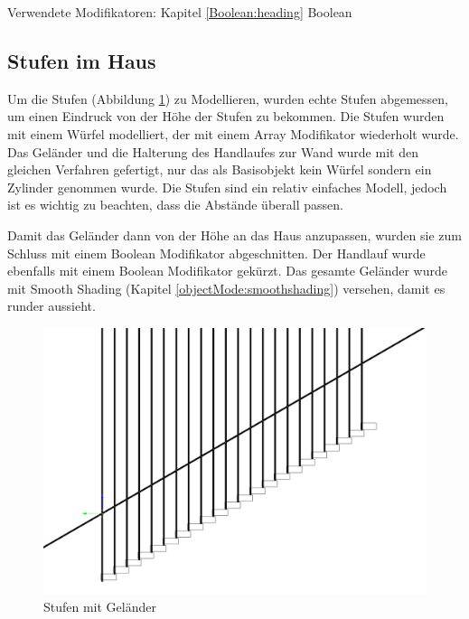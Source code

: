 Verwendete Modifikatoren: Kapitel \ref{Boolean:heading} Boolean

\subsection{Stufen im Haus}
\label{Stufen_Im_Haus:Heading}
Um die Stufen (Abbildung \ref{Stufen_Im_Haus:Bild}) zu Modellieren, wurden echte Stufen abgemessen, um einen Eindruck von der Höhe der Stufen zu bekommen.
Die Stufen wurden mit einem Würfel modelliert, der mit einem Array Modifikator wiederholt wurde. Das Geländer und die Halterung des Handlaufes zur Wand
wurde mit den gleichen Verfahren gefertigt, nur das als Basisobjekt kein Würfel sondern ein Zylinder genommen wurde.
Die Stufen sind ein relativ einfaches Modell, jedoch ist es wichtig zu beachten, dass die Abstände überall passen.

Damit das Geländer dann von der Höhe an das Haus anzupassen, wurden sie zum Schluss mit einem Boolean Modifikator abgeschnitten.
Der Handlauf wurde ebenfalls mit einem Boolean Modifikator gekürzt. Das gesamte Geländer wurde mit Smooth Shading (Kapitel \ref{objectMode:smoothshading})
versehen, damit es runder aussieht.

\begin{figure}[H]
     \centering
     \includegraphics[width=.8\textwidth]{images/Stufen-Haus_Stufen.png}
     \caption{Stufen mit Geländer}
     \label{Stufen_Im_Haus:Bild}
\end{figure}


